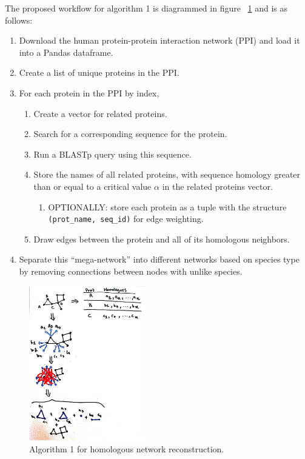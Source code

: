 \documentclass{acmsiggraph}               %
\begin{document}
The proposed workflow for algorithm 1 is diagrammed in figure ~\ref{fig:algo1} and is as follows:

\begin{enumerate}
    \item Download the human protein-protein interaction network (PPI) and load it into a Pandas dataframe.
    \item Create a list of unique proteins in the PPI.
    \item For each protein in the PPI by index,
    \begin{enumerate}
        \item Create a vector for related proteins. 
        \item Search for a corresponding sequence for the protein.
        \item Run a BLASTp query using this sequence. 
        \item Store the names of all related proteins, with sequence homology greater than or equal to a critical value \(\alpha\) in the related proteins vector. 
        \begin{enumerate}
            \item OPTIONALLY: store each protein as a tuple with the structure \texttt{(prot\_name, seq\_id)} for edge weighting.
        \end{enumerate}
        \item Draw edges between the protein and all of its homologous neighbors.
    \end{enumerate}
    \item Separate this ``mega-network'' into different networks based on species type by removing connections between nodes with unlike species.
\end{enumerate}

\begin{figure}
    \begin{center}
        \includegraphics[width=0.45\textwidth]{images/algo_1.jpg}
    \end{center}
    \caption{Algorithm 1 for homologous network reconstruction.}
    \label{fig:algo1}
\end{figure}
\end{document}
